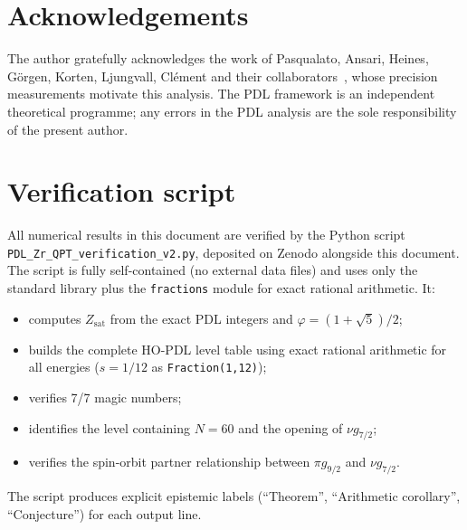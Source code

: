 \documentclass[11pt,a4paper]{article}
\theoremstyle{definition}
\theoremstyle{remark}
\newcommand{\Zsat}{Z_{\mathrm{sat}}}
\newcommand{\vp}{\varphi}
\begin{document}
\section*{Acknowledgements}

The author gratefully acknowledges the work of Pasqualato, Ansari, Heines, G{\"o}rgen, Korten, Ljungvall, Cl{\'e}ment and their collaborators~\cite{Pasqualato_2024}, whose precision measurements motivate this analysis. The PDL framework is an independent theoretical programme; any errors in the PDL analysis are the sole responsibility of the present author.

\appendix
\section{Verification script}
\label{app:code}

All numerical results in this document are verified by the Python script \\ \texttt{PDL\_Zr\_QPT\_verification\_v2.py}, deposited on Zenodo alongside this document. The script is fully self-contained (no external data files) and uses only the standard library plus the \texttt{fractions} module for exact rational arithmetic. It:
\begin{itemize}
  \item computes $\Zsat$ from the exact PDL integers and $\vp = (1+\sqrt{5})/2$;
  \item builds the complete HO-PDL level table using exact rational arithmetic for all energies ($s = 1/12$ as \texttt{Fraction(1,12)});
  \item verifies 7/7 magic numbers;
  \item identifies the level containing $N=60$ and the opening of $\nu g_{7/2}$;
  \item verifies the spin-orbit partner relationship between $\pi g_{9/2}$ and $\nu g_{7/2}$.
\end{itemize}

\noindent The script produces explicit epistemic labels (``Theorem'', ``Arithmetic corollary'', ``Conjecture'') for each output line.

\end{document}
